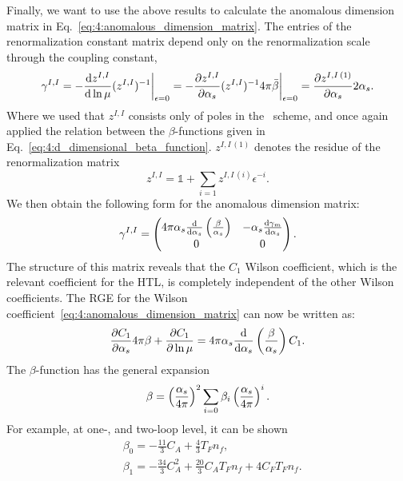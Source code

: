 Finally, we want to use the above results to calculate the anomalous dimension matrix in Eq.~\eqref{eq:4:anomalous_dimension_matrix}. The entries of the renormalization constant matrix depend only on the renormalization scale through the coupling constant, \ie\
\begin{equation}
\gamma^{I,I} = -\frac{\mathrm{d} z^{I,I}}{\mathrm{d} \ln \mu} (z^{I,I})^{-1} \bigg \vert_{\epsilon = 0} = -\frac{\partial z^{I,I}}{\partial \alpha_s} (z^{I,I})^{-1} 4 \pi \bar{\beta} \bigg \vert_{\epsilon = 0} = \frac{\partial z^{I,I\,(1)}}{\partial \alpha_s} 2 \alpha_s.
\end{equation}
Where we used that $z^{I,I}$ consists only of poles in the \MS\ scheme, and once again applied the relation between the $\beta$-functions given in Eq.~\eqref{eq:4:d_dimensional_beta_function}. $z^{I,I\, (1)}$ denotes the residue of the renormalization matrix
\begin{equation}
z^{I,I} = \mathbb{1} + \sum_{i = 1} z^{I,I\,(i)} \epsilon^{-i}.
\end{equation}
We then obtain the following form for the anomalous dimension matrix:
\begin{equation}
\gamma^{I,I} = \begin{pmatrix} 4 \pi \alpha_s \frac{\mathrm{d}}{\mathrm{d} \alpha_s} \left( \frac{\beta}{\alpha_s} \right) & - \alpha_s \frac{\mathrm{d} \gamma_m}{\mathrm{d} \alpha_s} \\
0 & 0 \end{pmatrix}.
\end{equation}
The structure of this matrix reveals that the $C_1$ Wilson coefficient, which is the relevant coefficient for the  \acs{HTL}, is completely independent of the other Wilson coefficients. The \acs{RGE} for the Wilson coefficient~\eqref{eq:4:anomalous_dimension_matrix} can now be written as:
\begin{equation}
\frac{\partial C_1}{\partial \alpha_s} 4 \pi \beta + \frac{\partial C_1}{\partial \ln \mu} = 4 \pi \alpha_s \frac{\mathrm{d} }{\mathrm{d} \alpha_s} \left(\frac{\beta}{\alpha_s} \right) C_1.
\label{eq:4:RGE_of_C1}
\end{equation}
The $\beta$-function has the general expansion
\begin{equation}
\beta = \left(\frac{\alpha_s}{4 \pi} \right)^2 \sum_{i = 0} \beta_i \left(\frac{\alpha_s}{4 \pi} \right)^i.
\end{equation}
For example, at one-, and two-loop level, it can be shown~\cite{Gross:1973id, Politzer:1973fx, tHooft:1972ikm, Caswell:1974gg, Jones:1974mm, Egorian:1978zx}
\begin{equation}
\begin{split}
&\beta_0 = -\frac{11}{3} C_A + \frac{4}{3} T_F n_f, \\
&\beta_1 = -\frac{34}{3} C_A^2 + \frac{20}{3} C_A T_F n_f + 4 C_F T_F n_f.
\end{split}
\label{eq:4:beta0_and_beta1}
\end{equation}
